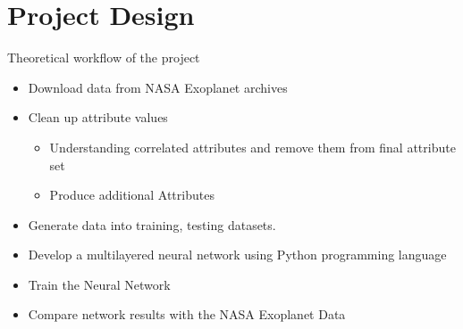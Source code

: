  \chapter{Project Design}

Theoretical workflow of the project 

\begin{itemize}
\item Download data from NASA Exoplanet archives 
\item Clean up attribute values 
	\begin{itemize}
		\item Understanding correlated attributes and remove them from final attribute set
		\item Produce additional Attributes
	\end{itemize}
\item Generate data into training, testing datasets. 
\item Develop a multilayered neural network using Python programming language 
\item Train the Neural Network 
\item Compare network results with the NASA Exoplanet Data
\end{itemize}